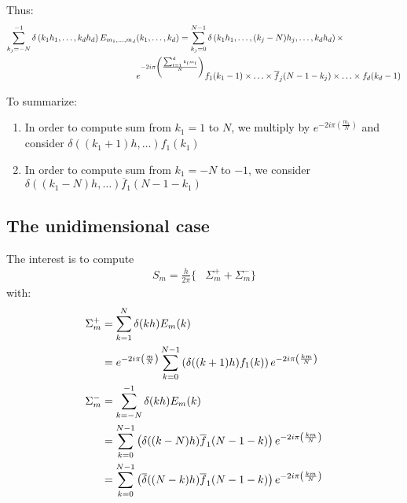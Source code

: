 Thus:
\begin{align}
\sum_{k_j=-N}^{-1}\delta\left(k_1h_1,\hdots,k_dh_d\right) E_{m_1,\hdots,m_d}&(k_1,\hdots,k_d)
  = \sum_{k_j=0}^{N-1}\delta\left(k_1h_1,\hdots,(k_j-N)h_j,\hdots,k_dh_d\right) \times\notag\\
  & e^{-2i\pi\left(\frac{\sum_{l=1}^{d}k_l m_l}{N}\right)}
     f_1(k_1-1)\times\hdots\times \overline{f}_j(N-1-k_j)\times\hdots\times f_d(k_d-1) \label{Eq:j-sigma-}
\end{align}

To summarize:
\begin{enumerate}
\item In order to compute sum from $k_1=1$ to $N$, we multiply by $e^{-2i\pi\left(\frac{m_1}{N}\right)}$ and consider $\delta((k_1+1)h,\hdots)f_1(k_1)$
\item In order to compute sum from $k_1=-N$ to $-1$, we consider $\delta((k_1-N)h,\hdots)\overline{f}_1(N-1-k_1)$
\end{enumerate}

\subsection{The unidimensional case}

The interest is to compute
\begin{align}
S_{m}=\frac{h}{2\pi}\Big\{&\Sigma_{m}^{+} + \Sigma_{m}^{-} \Big\}
\end{align}
with:
\begin{align}
\Sigma_{m}^{+}&=\sum_{k=1}^{N}\delta( kh)E_{m}(k) \notag\\
  &=e^{-2i\pi\left(\frac{m}{N}\right)} \sum_{k=0}^{N-1}\left(\delta((k+1)h) f_1(k)\right) e^{-2i\pi\left(\frac{k m}{N}\right)} \\
\Sigma_{m}^{-}&=\sum_{k=-N}^{-1}\delta(kh)E_{m}(k) \notag\\
  &= \sum_{k=0}^{N-1}\left(\delta((k-N)h) \overline{f}_1(N-1-k)\right) e^{-2i\pi\left(\frac{k m}{N}\right)} \notag\\
  &= \sum_{k=0}^{N-1}\left(\overline{\delta}((N-k)h) \overline{f}_1(N-1-k)\right) e^{-2i\pi\left(\frac{k m}{N}\right)}
\end{align}

